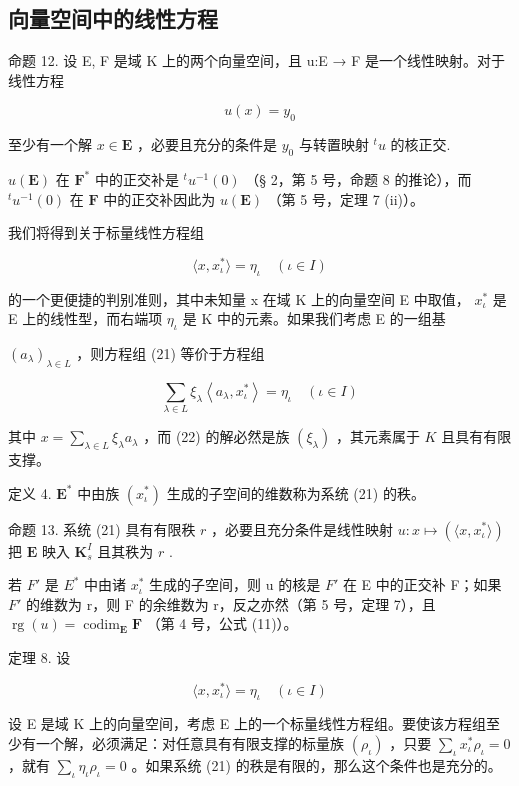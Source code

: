 \subsection{向量空间中的线性方程}

命题 12. 设 E, F 是域 K 上的两个向量空间，且 u:E → F 是一个线性映射。对于线性方程

\[
u (x) = y _ {0}\tag{20}
\]

至少有一个解 \(x \in \mathbf{E}\) ，必要且充分的条件是 \(y_0\) 与转置映射 \(^t u\) 的核正交.

\(u(\mathbf{E})\) 在 \(\mathbf{F}^*\) 中的正交补是 \({}^t u^{-1}(0)\) （§ 2，第 5 号，命题 8 的推论），而 \({}^t u^{-1}(0)\) 在 \(\mathbf{F}\) 中的正交补因此为 \(u(\mathbf{E})\) （第 5 号，定理 7 (ii)）。

我们将得到关于标量线性方程组

\[
\langle x, x _ {\iota} ^ {*} \rangle = \eta_ {\iota} \quad (\iota \in I)\tag{21}
\]

的一个更便捷的判别准则，其中未知量 x 在域 K 上的向量空间 E 中取值， \(x_{\iota}^{*}\) 是 E 上的线性型，而右端项 \(\eta_{\iota}\) 是 K 中的元素。如果我们考虑 E 的一组基

\((a_{\lambda})_{\lambda\in L}\) ，则方程组 (21) 等价于方程组

\[
\sum_ {\lambda \in L} \xi_ {\lambda} \left\langle a _ {\lambda}, x _ {\iota} ^ {*} \right\rangle = \eta_ {\iota} \quad (\iota \in I)\tag{22}
\]

其中 \(x = \sum_{\lambda \in L} \xi_{\lambda} a_{\lambda}\) ，而 (22) 的解必然是族 \((\xi_{\lambda})\) ，其元素属于 \(K\) 且具有有限支撑。

定义 4. \(\mathbf{E}^*\) 中由族 \((x_{\iota}^{*})\) 生成的子空间的维数称为系统 (21) 的秩。

命题 13. 系统 (21) 具有有限秩 \(r\) ，必要且充分条件是线性映射 \(u: x \mapsto (\langle x, x_{\iota}^* \rangle)\) 把 \(\mathbf{E}\) 映入 \(\mathbf{K}_s^I\) 且其秩为 \(r\) .

若 \(F'\) 是 \(E^{*}\) 中由诸 \(x_{\iota}^{*}\) 生成的子空间，则 u 的核是 \(F'\) 在 E 中的正交补 F；如果 \(F'\) 的维数为 r，则 F 的余维数为 r，反之亦然（第 5 号，定理 7），且 \(\operatorname{rg}(u) = \operatorname{codim}_{\mathbf{E}} \mathbf{F}\) （第 4 号，公式 (11)）。

定理 8. 设

\[
\langle x, x _ {\iota} ^ {*} \rangle = \eta_ {\iota} \quad (\iota \in I)\tag{21}
\]

设 E 是域 K 上的向量空间，考虑 E 上的一个标量线性方程组。要使该方程组至少有一个解，必须满足：对任意具有有限支撑的标量族 \((\rho_{\iota})\) ，只要 \(\sum_{\iota} x_{\iota}^{*}\rho_{\iota}=0\) ，就有 \(\sum_{\iota}\eta_{\iota}\rho_{\iota}=0\) 。如果系统 (21) 的秩是有限的，那么这个条件也是充分的。

